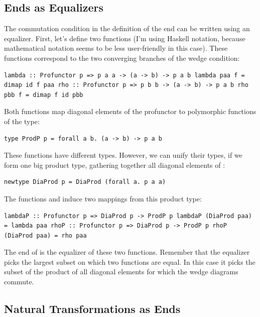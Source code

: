 \subsection{Ends as Equalizers}\label{ends-as-equalizers}

The commutation condition in the definition of the end can be written
using an equalizer. First, let's define two functions (I'm using Haskell
notation, because mathematical notation seems to be less user-friendly
in this case). These functions correspond to the two converging branches
of the wedge condition:

\begin{verbatim}
lambda :: Profunctor p => p a a -> (a -> b) -> p a b lambda paa f = dimap id f paa rho :: Profunctor p => p b b -> (a -> b) -> p a b rho pbb f = dimap f id pbb
\end{verbatim}

Both functions map diagonal elements of the profunctor  to
polymorphic functions of the type:

\begin{verbatim}
type ProdP p = forall a b. (a -> b) -> p a b
\end{verbatim}

These functions have different types. However, we can unify their types,
if we form one big product type, gathering together all diagonal
elements of :

\begin{verbatim}
newtype DiaProd p = DiaProd (forall a. p a a)
\end{verbatim}

The functions  and  induce two mappings from
this product type:

\begin{verbatim}
lambdaP :: Profunctor p => DiaProd p -> ProdP p lambdaP (DiaProd paa) = lambda paa rhoP :: Profunctor p => DiaProd p -> ProdP p rhoP (DiaProd paa) = rho paa
\end{verbatim}

The end of  is the equalizer of these two functions. Remember
that the equalizer picks the largest subset on which two functions are
equal. In this case it picks the subset of the product of all diagonal
elements for which the wedge diagrams commute.

\subsection{Natural Transformations as
Ends}\label{natural-transformations-as-ends}

